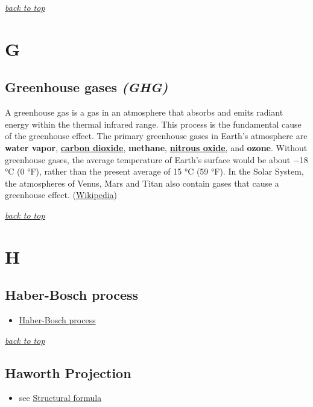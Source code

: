 \documentclass[]{book}
\providecommand{\tightlist}{%
  \setlength{\itemsep}{0pt}\setlength{\parskip}{0pt}}
\theoremstyle{definition}
\theoremstyle{definition}
\theoremstyle{definition}
\theoremstyle{remark}
\begin{document}
\emph{\protect\hyperlink{top}{back to top}}

\section{G}\label{g}

\subsection{\texorpdfstring{Greenhouse gases
\emph{(GHG)}}{Greenhouse gases (GHG)}}\label{greenhouse-gases-ghg}

A greenhouse gas is a gas in an atmosphere that absorbs and emits
radiant energy within the thermal infrared range. This process is the
fundamental cause of the greenhouse effect. The primary greenhouse gases
in Earth's atmosphere are \textbf{water vapor},
\textbf{\protect\hyperlink{CO2}{carbon dioxide}}, \textbf{methane},
\textbf{\protect\hyperlink{N2O}{nitrous oxide}}, and \textbf{ozone}.
Without greenhouse gases, the average temperature of Earth's surface
would be about −18 °C (0 °F), rather than the present average of 15 °C
(59 °F). In the Solar System, the atmospheres of Venus, Mars and Titan
also contain gases that cause a greenhouse effect.
(\href{https://en.wikipedia.org/wiki/Greenhouse_gas}{Wikipedia})

\emph{\protect\hyperlink{top}{back to top}}

\section{H}\label{h}

\subsection{Haber-Bosch process}\label{haber-bosch-process}

\begin{itemize}
\tightlist
\item
  \href{https://en.wikipedia.org/wiki/Haber_process}{Haber-Bosch
  process}
\end{itemize}

\emph{\protect\hyperlink{top}{back to top}}

\subsection{Haworth Projection}\label{haworth-projection}

\begin{itemize}
\tightlist
\item
  see \protect\hyperlink{structural-formula}{Structural formula}
\end{itemize}
\end{document}
